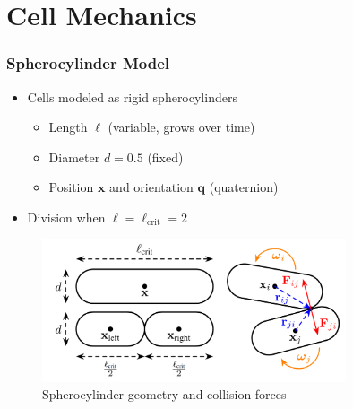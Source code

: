 \documentclass[
	10pt,
	t
]{beamer}
\begin{document}
\section{Cell Mechanics}

\begin{frame}
    \frametitle{Spherocylinder Model}

    \begin{itemize}
        \item Cells modeled as rigid spherocylinders
              \begin{itemize}
                  \item Length $\ell$ (variable, grows over time)
                  \item Diameter $d = 0.5$ (fixed)
                  \item Position $\mathbf{x}$ and orientation $\mathbf{q}$ (quaternion)
              \end{itemize}
        \item Division when $\ell = \ell_{\text{crit}} = 2$
    \end{itemize}

    \vspace{0.2cm}

    \begin{figure}
        \centering
        \includegraphics[width=0.8\textwidth]{figures/spherocylinder_model.png}
        \caption{\scriptsize{Spherocylinder geometry and collision forces}}
    \end{figure}

\end{frame}
\end{document}
